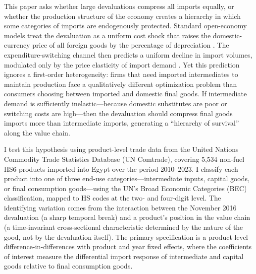 \documentclass[12pt]{article}
\begin{document}
This paper asks whether large devaluations compress all imports equally, or whether the production structure of the economy creates a hierarchy in which some categories of imports are endogenously protected. Standard open-economy models treat the devaluation as a uniform cost shock that raises the domestic-currency price of all foreign goods by the percentage of depreciation \citep{obstfeld1996foundations}. The expenditure-switching channel then predicts a uniform decline in import volumes, modulated only by the price elasticity of import demand \citep{burstein2005large}. Yet this prediction ignores a first-order heterogeneity: firms that need imported intermediates to maintain production face a qualitatively different optimization problem than consumers choosing between imported and domestic final goods. If intermediate demand is sufficiently inelastic---because domestic substitutes are poor or switching costs are high---then the devaluation should compress final goods imports more than intermediate imports, generating a ``hierarchy of survival'' along the value chain.

I test this hypothesis using product-level trade data from the United Nations Commodity Trade Statistics Database (UN Comtrade), covering 5,534 non-fuel HS6 products imported into Egypt over the period 2010--2023. I classify each product into one of three end-use categories---intermediate inputs, capital goods, or final consumption goods---using the UN's Broad Economic Categories (BEC) classification, mapped to HS codes at the two- and four-digit level. The identifying variation comes from the interaction between the November 2016 devaluation (a sharp temporal break) and a product's position in the value chain (a time-invariant cross-sectional characteristic determined by the nature of the good, not by the devaluation itself). The primary specification is a product-level difference-in-differences with product and year fixed effects, where the coefficients of interest measure the differential import response of intermediate and capital goods relative to final consumption goods.
\end{document}
